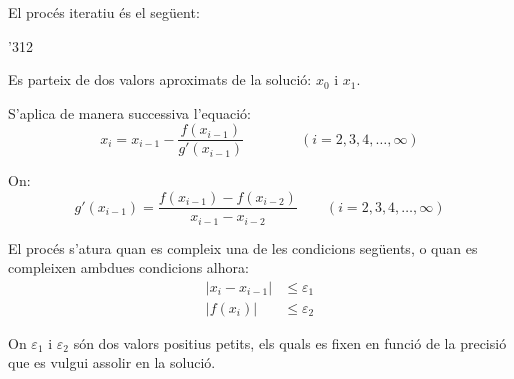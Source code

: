 \begin{center}
    
    \label{pic:metode-secant}
\end{center}


El procés iteratiu és el següent:

\begin{dingautolist}{'312}
    \item Es parteix de dos valors aproximats de la solució: $x_0$ i $x_1$.

    \item   S'aplica de manera successiva l'equació:
            \begin{equation}\label{eq:secant-1}
              x_i = x_{i-1} - \frac{f(x_{i-1})}{g'(x_{i-1})} \qquad\qquad (i=2,3,4,\dots,\infty)
            \end{equation}

            On:
            \begin{equation}\label{eq:secant-2}
              g'(x_{i-1}) = \frac{f(x_{i-1}) - f(x_{i-2}) } {x_{i-1} - x_{i-2}} \qquad (i=2,3,4,\dots,\infty)
            \end{equation}

    \item   El procés s'atura quan es compleix una de les condicions següents, o quan es compleixen ambdues condicions alhora:
            \begin{subequations}\begin{align}
              |x_i - x_{i-1}| &\leq \varepsilon_1 \\
              |f(x_i)| &\leq \varepsilon_2
            \end{align}\end{subequations}

            On $\varepsilon_1$ i $\varepsilon_2$ són dos valors positius petits, els quals es fixen en funció de la precisió que es vulgui assolir en la solució.
\end{dingautolist}

